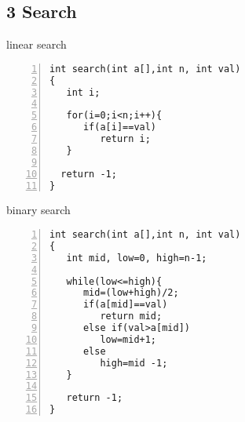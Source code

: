\documentclass{beamer}
\begin{document}
\subsection*{3 Search}
\begin{frame}[fragile]{linear search}
\begin{lstlisting}[numbers=left]
int search(int a[],int n, int val)
{
   int i;

   for(i=0;i<n;i++){
      if(a[i]==val)
         return i;
   }

  return -1;
}
\end{lstlisting}
\end{frame}

\begin{frame}[fragile]{binary search}
\begin{lstlisting}[numbers=left] 
int search(int a[],int n, int val)
{
   int mid, low=0, high=n-1;

   while(low<=high){
      mid=(low+high)/2;
      if(a[mid]==val)
         return mid;
      else if(val>a[mid])
         low=mid+1;
      else
         high=mid -1;
   }

   return -1;
}
\end{lstlisting}
\end{frame}
\end{document}
